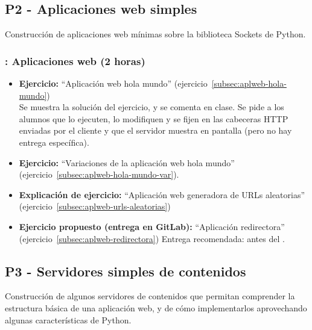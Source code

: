 \documentclass[a4paper,12pt]{article}
\begin{document}
\subsection{P2 - Aplicaciones web simples}


Construcción de aplicaciones web mínimas sobre la biblioteca Sockets de Python.


\subsubsection{\lunesD: Aplicaciones web (2 horas)}
\label{cal:lunesD}

\begin{itemize}
 \item \textbf{Ejercicio:} ``Aplicación web hola mundo'' (ejercicio~\ref{subsec:aplweb-hola-mundo}) \\
   Se muestra la solución del ejercicio, y se comenta en clase. Se pide a los alumnos que lo ejecuten, lo modifiquen y se fijen en las cabeceras HTTP enviadas por el cliente y que el servidor muestra en pantalla (pero no hay entrega específica).
 \item \textbf{Ejercicio:} ``Variaciones de la aplicación web hola mundo'' (ejercicio~\ref{subsec:aplweb-hola-mundo-var}).
\item \textbf{Explicación de ejercicio:} ``Aplicación web generadora de URLs aleatorias'' (ejercicio~\ref{subsec:aplweb-urls-aleatorias})
\item \textbf{Ejercicio propuesto (entrega en GitLab):} ``Aplicación redirectora'' (ejercicio~\ref{subsec:aplweb-redirectora})
   Entrega recomendada: antes del \lunesE.
\end{itemize}


\subsection{P3 - Servidores simples de contenidos}

Construcción de algunos servidores de contenidos que permitan comprender la estructura básica de una aplicación web, y de cómo implementarlos aprovechando algunas características de Python.

\end{document}
